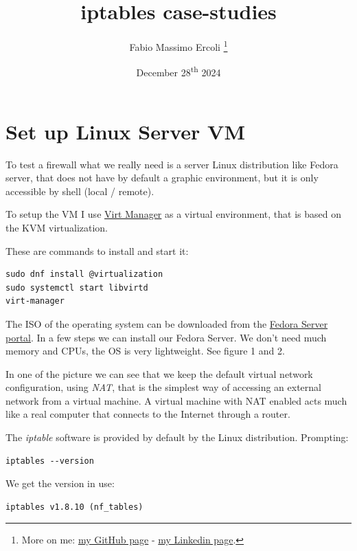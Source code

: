 \documentclass{article}
\title{iptables case-studies}
\author{Fabio Massimo Ercoli
	\footnote{
		More on me:
		\href{https://github.com/fax4ever}{my GitHub page} -
		\href{https://www.linkedin.com/in/fabioercoli}{my Linkedin page}.
}}
\date{December 28\textsuperscript{th} 2024}
\begin{document}
\maketitle
\thispagestyle{empty}

\section{Set up Linux Server VM}
To test a firewall what we really need is a server Linux distribution like Fedora server,
that does not have by default a graphic environment, but it is only
accessible by shell (local / remote).

To setup the VM I use \href{https://virt-manager.org/}{Virt Manager} as a virtual environment,
that is based on the KVM virtualization.

These are commands to install and start it: 

\begin{verbatim}
sudo dnf install @virtualization
sudo systemctl start libvirtd
virt-manager
\end{verbatim}

The ISO of the operating system can be downloaded from the
\href{https://fedoraproject.org/server/download}{Fedora Server portal}.
In a few steps we can install our Fedora Server.
We don't need much memory and CPUs, the OS is very lightweight. See figure 1 and 2.

In one of the picture we can see that we keep the default virtual network configuration,
using \emph{NAT}, that is the simplest way of accessing an external network from a virtual machine.
 A virtual machine with NAT enabled acts much like a real computer that connects to the Internet through a router.
 
The \emph{iptable} software is provided by default by the Linux distribution.
Prompting: 

\begin{verbatim}
iptables --version
\end{verbatim}

\noindent We get the version in use:

\begin{verbatim}
iptables v1.8.10 (nf_tables)
\end{verbatim}
\end{document}
